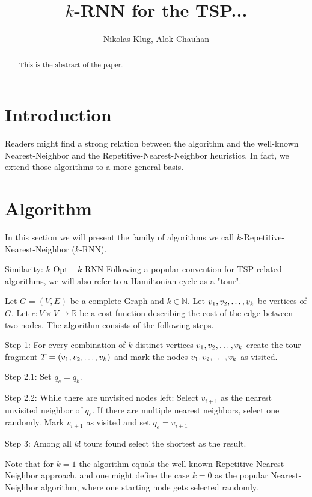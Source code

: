 \documentclass[11pt]{article}
\title{$k$-RNN for the TSP...}
\author{Nikolas Klug, Alok Chauhan}
\begin{document}
	\maketitle
	\begin{abstract}
		This is the abstract of the paper.
	\end{abstract}

	\section{Introduction}
	\label{sec:introduction}
	
		Readers might find a strong relation between the algorithm and the well-known Nearest-Neighbor and the Repetitive-Nearest-Neighbor heuristics. 
	In fact, we extend those algorithms to a more general basis.
	
	\section{Algorithm}
	\label{sec:algorithm}
	In this section we will present the family of algorithms we call $k$-Repetitive-Nearest-Neighbor ($k$-RNN).

	Similarity: $k$-Opt -- $k$-RNN
	Following a popular convention for TSP-related algorithms, we will also refer to a Hamiltonian cycle as a "tour". 	
	
	Let $G = (V, E)$ be a complete Graph and $k \in \mathbb{N}$. Let $v_1, v_2, \mathellipsis, v_k$ be vertices of $G$. 
	Let $c: V \times V \rightarrow \mathbb{R}$ be a cost function describing the cost of the edge between two nodes. 
	The algorithm consists of the following steps.
	
	Step 1: For every combination of $k$ distinct vertices $v_1, v_2, \mathellipsis, v_k$ create the tour fragment $T = (v_1, v_2, \mathellipsis, v_k)$ and mark the nodes $v_1, v_2, \mathellipsis, v_k$ as visited.
	
	Step 2.1: Set $q_e = q_k$.
	
	Step 2.2: While there are unvisited nodes left: 
	Select $v_{i+1}$ as the nearest unvisited neighbor of $q_e$. If there are multiple nearest neighbors, select one randomly.
	Mark $v_{i+1}$ as visited and set $q_e = v_{i+1}$
	
	Step 3: Among all $k!$ tours found select the shortest as the result.
	
	
	
	Note that for $k = 1$ the algorithm equals the well-known Repetitive-Nearest-Neighbor approach, and one might define the case $k = 0$ as the popular Nearest-Neighbor algorithm, where one starting node gets selected randomly.
	
\end{document}
